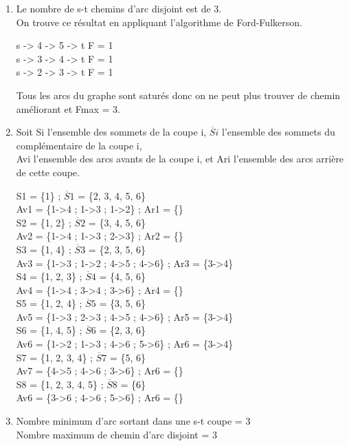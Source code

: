 \documentclass[]{article}
\begin{document}
\begin{enumerate}

\item Le nombre de s-t chemins d'arc disjoint est de 3.\\
On trouve ce résultat en appliquant l'algorithme de Ford-Fulkerson.\\
\begin{center}
s -> 4 -> 5 -> t      F = 1\\
s -> 3 -> 4 -> t      F = 1\\
s -> 2 -> 3 -> t      F = 1\\
\end{center}
Tous les arcs du graphe sont saturés donc on ne peut plus trouver de chemin améliorant et Fmax = 3.\\


\item Soit Si l'ensemble des sommets de la coupe i, $\overline Si$ l'ensemble des sommets du complémentaire de la coupe i, \\
Avi l'ensemble des arcs avants de la coupe i, et Ari l'ensemble des arcs arrière de cette coupe.\\
\begin{center}
S1 = \{1\} ; $\overline S1$ = \{2, 3, 4, 5, 6\}\\ 
Av1 = \{1->4 ; 1->3 ; 1->2\} ; Ar1 = \{\}\\
S2 = \{1, 2\} ; $\overline S2$ = \{3, 4, 5, 6\}\\
Av2 = \{1->4 ; 1->3 ; 2->3\} ; Ar2 = \{\}\\ 
S3 = \{1, 4\} ; $\overline S3$ = \{2, 3, 5, 6\}\\
Av3 = \{1->3 ; 1->2 ; 4->5 ; 4->6\} ; Ar3 = \{3->4\}\\
S4 = \{1, 2, 3\} ; $\overline S4$ = \{4, 5, 6\}\\ 
Av4 = \{1->4 ; 3->4 ; 3->6\} ; Ar4 = \{\}\\
S5 = \{1, 2, 4\} ; $\overline S5$ = \{3, 5, 6\}\\
Av5 = \{1->3 ; 2->3 ; 4->5 ; 4->6\} ; Ar5 = \{3->4\}\\
S6 = \{1, 4, 5\} ; $\overline S6$ = \{2, 3, 6\}\\
Av6 = \{1->2 ; 1->3 ; 4->6 ; 5->6\} ; Ar6 = \{3->4\}\\ 
S7 = \{1, 2, 3, 4\} ; $\overline S7$ = \{5, 6\}\\ 
Av7 = \{4->5 ; 4->6 ; 3->6\} ; Ar6 = \{\}\\ 
S8 = \{1, 2, 3, 4, 5\} ; $\overline S8$ = \{6\}\\
Av6 = \{3->6 ; 4->6 ; 5->6\} ; Ar6 = \{\}\\
\end{center}


\item Nombre minimum d'arc sortant dans une s-t coupe = 3\\
  Nombre maximum de chemin d'arc disjoint = 3\\

\end{enumerate}
\end{document}
